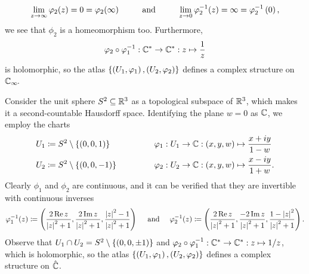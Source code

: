 \documentclass[../Moduli_Spaces_of_Riemann_Surfaces.tex]{subfiles}
\begin{document}
\begin{example}
        \begin{equation*}
            \lim\limits_{z\to\infty}\phi_2\!\l(z\r)=0=\phi_2\!\l(\infty\r)\ \ \ \ \ \ \ \ \textrm{and}\ \ \ \ \ \ \ \ \lim\limits_{z\to0}\phi_2^{-1}\!\l(z\r)=\infty=\phi_2^{-1}\l(0\r),
        \end{equation*}
        we see that $\phi_2$ is a homeomorphism too. Furthermore,
        \begin{equation*}
            \varphi_2\circ\varphi_1^{-1}:\mathbb{C}^\ast\to\mathbb{C}^\ast:z\mapsto\frac{1}{z}
        \end{equation*}
        is holomorphic, so the atlas $\left\{\left(U_1,\varphi_1\right),\left(U_2,\varphi_2\right)\right\}$ defines a complex structure on $\mathbb{C}_\infty\!$.\exqed
    \end{example}
    \begin{example}\label{1.1:stereographic_projection}
        Consider the unit sphere $S^2\subseteq\mathbb{R}^3$ as a topological subspace of $\mathbb{R}^3$, which makes it a second-countable Hausdorff space. Identifying the plane $w=0$ as $\mathbb{C}$, we employ the charts
        \begin{equation*}
            \begin{alignedat}{2}
                U_1&\coloneqq S^2\comp\l\{\l(0,0,1\r)\r\}\ \ \ \ \ \ \ \ \ \ \ \ \ \ \ \ &&\phi_1:U_1\to\C:\tpl{x,y,w}\mapsto\frac{x+iy}{1-w} \\
                U_2&\coloneqq S^2\comp\l\{\l(0,0,-1\r)\r\}&&\phi_2:U_2\to\C:\tpl{x,y,w}\mapsto\frac{x-iy}{1+w}.
            \end{alignedat}
        \end{equation*}
        Clearly $\phi_1$ and $\phi_2$ are continuous, and it can be verified that they are invertible with continuous inverses
        \begin{equation*}
            \phi_1^{-1}\!\l(z\r)\coloneqq\tpl{\frac{2\Re z}{\l|z\r|^2+1},\frac{2\Im z}{\l|z\r|^2+1},\frac{\l|z\r|^2-1}{\l|z\r|^2+1}}\ \ \ \ \textrm{and}\ \ \ \ \phi_2^{-1}\!\l(z\r)\coloneqq\tpl{\frac{2\Re z}{\l|z\r|^2+1},\frac{-2\Im z}{\l|z\r|^2+1},\frac{1-\l|z\r|^2}{\l|z\r|^2+1}}.
        \end{equation*}
        Observe that $U_1\cap U_2=S^2\setminus\left\{\left(0,0,\pm1\right)\right\}$ and $\varphi_2\circ\varphi_1^{-1}:\mathbb{C}^\ast\to\mathbb{C}^\ast:z\mapsto1/z$, which is holomorphic, so the atlas $\left\{\left(U_1,\varphi_1\right),\left(U_2,\varphi_2\right)\right\}$ defines a complex structure on $\hat{\mathbb{C}}$.\exqed
    \end{example}
\end{document}
